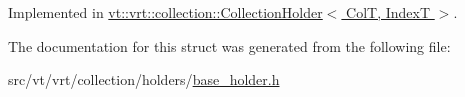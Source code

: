 Implemented in \hyperlink{structvt_1_1vrt_1_1collection_1_1_collection_holder_a09a3f3e6ec221f36f3417713e64e8f69}{vt\+::vrt\+::collection\+::\+Collection\+Holder$<$ Col\+T, Index\+T $>$}.



The documentation for this struct was generated from the following file\+:\begin{DoxyCompactItemize}
\item 
src/vt/vrt/collection/holders/\hyperlink{base__holder_8h}{base\+\_\+holder.\+h}\end{DoxyCompactItemize}
